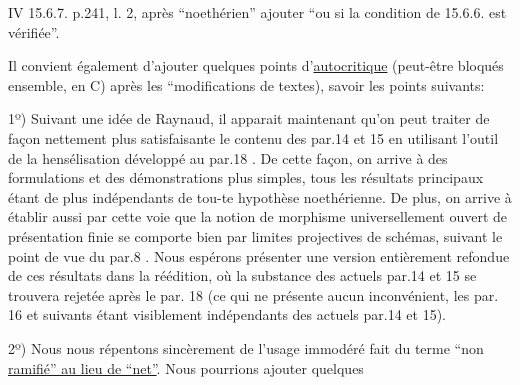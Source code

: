 

IV 15.6.7. p.241, l. 2, après ``noethérien'' ajouter ``ou si la condition
de 15.6.6. est vérifiée''.

Il convient également d'ajouter quelques points d'\uline{autocritique} (peut-être bloqués ensemble, en C) après les ``modifications de textes), savoir les points suivants:

1º) Suivant une idée de Raynaud, il apparait maintenant qu'on peut traiter de façon nettement plus satisfaisante le contenu des par.14 et 15 en utilisant l'outil de la hensélisation développé au par.18 . De cette façon, on arrive à des formulations et des démonstrations plus simples, tous les résultats principaux étant de plus indépendants de tou-te hypothèse noethérienne. De plus, on arrive à établir aussi par cette voie que la notion de morphisme universellement ouvert  de présentation finie se comporte bien par limites projectives de schémas, suivant le point de vue du par.8 . Nous espérons présenter une version entièrement refondue de ces résultats dans la réédition, où  la substance des actuels par.14 et 15 se trouvera rejetée après le par. 18 (ce qui ne présente aucun inconvénient, les par. 16 et suivants étant visiblement indépendants des actuels par.14 et 15).

2º) Nous nous répentons sincèrement de l'usage immodéré fait du terme ``non \uline{ramifié'' au lieu de ``net''}. Nous pourrions ajouter quelques

